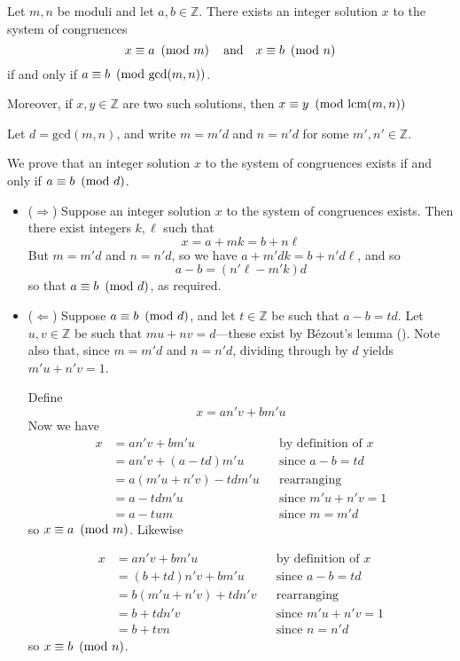 \begin{theorem}
\label{thmCRTGeneral}
Let $m,n$ be moduli and let $a,b \in \mathbb{Z}$. There exists an integer solution $x$ to the system of congruences
\[ x \equiv a ~\left(\text{mod}~m\right) \quad \text{and} \quad x \equiv b ~\left(\text{mod}~n\right) \]
if and only if $a \equiv b ~\left(\text{mod}~\mathrm{gcd}(m,n)\right)$.

Moreover, if $x,y \in \mathbb{Z}$ are two such solutions, then $x \equiv y ~\left(\text{mod}~\mathrm{lcm}(m,n)\right)$
\end{theorem}
\begin{cproof}
Let $d=\mathrm{gcd}(m,n)$, and write $m=m'd$ and $n=n'd$ for some $m',n' \in \mathbb{Z}$.

We prove that an integer solution $x$ to the system of congruences exists if and only if $a \equiv b ~\left(\text{mod}~d\right)$.

\begin{itemize}
\item ($\Rightarrow$) Suppose an integer solution $x$ to the system of congruences exists. Then there exist integers $k, \ell$ such that
\[ x = a+mk = b+n\ell \]
But $m=m'd$ and $n=n'd$, so we have $a+m'dk=b+n'd\ell$, and so
\[ a-b = (n'\ell - m'k)d \]
so that $a \equiv b ~\left(\text{mod}~d\right)$, as required.

\item ($\Leftarrow$) Suppose $a \equiv b ~\left(\text{mod}~d\right)$, and let $t \in \mathbb{Z}$ be such that $a-b=td$. Let $u,v \in \mathbb{Z}$ be such that $mu+nv=d$---these exist by B\'{e}zout's lemma (). Note also that, since $m=m'd$ and $n=n'd$, dividing through by $d$ yields $m'u+n'v=1$.

Define
\[ x = an'v+bm'u \]
Now we have
\begin{align*}
x &= an'v + bm'u && \text{by definition of $x$} \\
&= an'v + (a-td)m'u && \text{since $a-b=td$} \\
&= a(m'u+n'v) - tdm'u && \text{rearranging} \\
&= a - tdm'u && \text{since $m'u+n'v=1$} \\
&= a - tum && \text{since $m=m'd$}
\end{align*}
so $x \equiv a ~\left(\text{mod}~m\right)$. Likewise

\begin{align*}
x &= an'v+bm'u && \text{by definition of $x$} \\
&= (b+td)n'v + bm'u && \text{since $a-b=td$} \\
&= b(m'u+n'v) + tdn'v && \text{rearranging} \\
&= b + tdn'v && \text{since $m'u+n'v=1$} \\
&= b + tvn && \text{since $n=n'd$}
\end{align*}
so $x \equiv b ~\left(\text{mod}~n\right)$.


\end{itemize}
\end{cproof}
